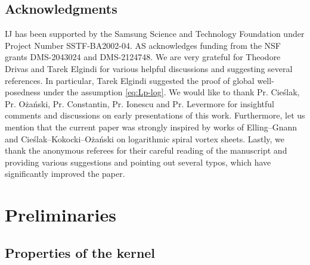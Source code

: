 \documentclass[10pt]{article}
\theoremstyle{definition}
\theoremstyle{remark}
\numberwithin{equation}{section}
\newcommand{\0}{\emptyset}
\begin{document}
\subsection*{Acknowledgments}
		IJ has been supported  by the Samsung Science and Technology Foundation under Project Number SSTF-BA2002-04. AS acknowledges funding from the NSF grants DMS-2043024 and DMS-2124748. We are very grateful for Theodore Drivas and Tarek Elgindi for various helpful discussions and suggesting several references. In particular, Tarek Elgindi suggested the proof of global well-posedness under the assumption \eqref{eq:Lp-log}. We would like to thank Pr. Cie{\'s}lak, Pr. O{\.z}a{\'n}ski, Pr. Constantin, Pr. Ionescu and Pr. Levermore for insightful comments and discussions on early presentations of this work. Furthermore, let us mention that the current paper was strongly inspired by works of Elling--Gnann and Cie{\'s}lak--Kokocki--O{\.z}a{\'n}ski on logarithmic spiral vortex sheets. Lastly, we thank the anonymous referees for their careful reading of the manuscript and providing various suggestions and pointing out several typos, which have significantly improved the paper. 
	
	\section{Preliminaries}\label{sec:prelim}
	
	\subsection{Properties of the kernel}\label{subsec:elliptic}
	
\end{document}
